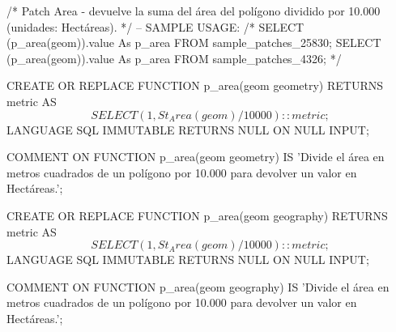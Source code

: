 \lstset{caption=Función para calcular AREA de un polígono.,label= p_area}
\begin{SQL}
/*
Patch Area - devuelve la suma del área del polígono dividido por 10.000 (unidades: Hectáreas).
*/
-- SAMPLE USAGE:
/*
SELECT (p_area(geom)).value As p_area FROM sample_patches_25830;
SELECT (p_area(geom)).value As p_area FROM sample_patches_4326;
*/

CREATE OR REPLACE FUNCTION p_area(geom geometry)
RETURNS metric AS 
$$

SELECT (1, St_Area(geom)/10000)::metric;

$$
LANGUAGE SQL
IMMUTABLE
RETURNS NULL ON NULL INPUT;

COMMENT ON FUNCTION p_area(geom geometry) IS 'Divide el área en metros cuadrados de un polígono por 10.000 para devolver un valor en Hectáreas.';


CREATE OR REPLACE FUNCTION p_area(geom geography)
RETURNS metric AS 
$$

SELECT (1, St_Area(geom)/10000)::metric;

$$
LANGUAGE SQL
IMMUTABLE
RETURNS NULL ON NULL INPUT;

COMMENT ON FUNCTION p_area(geom geography) IS 'Divide el área en metros cuadrados de un polígono por 10.000 para devolver un valor en Hectáreas.';


\end{SQL}
